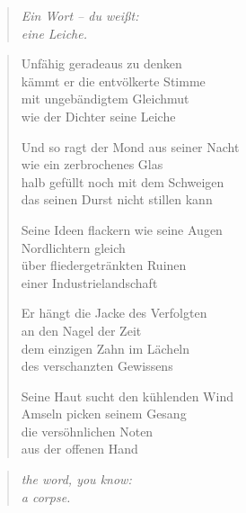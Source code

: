 
\cleartoverso


\begin{quote}
\itshape\smaller
Ein Wort -- du weißt:\\
eine Leiche.

\end{quote}

\begin{verse}

Unfähig geradeaus zu denken\\
kämmt er die entvölkerte Stimme\\
mit ungebändigtem Gleichmut\\
wie der Dichter seine Leiche

Und so ragt der Mond aus seiner Nacht\\
wie ein zerbrochenes Glas\\
halb gefüllt noch mit dem Schweigen\\
das seinen Durst nicht stillen kann

Seine Ideen flackern wie seine Augen\\
Nordlichtern gleich\\
über fliedergetränkten Ruinen\\
einer Industrielandschaft

Er hängt die Jacke des Verfolgten\\
an den Nagel der Zeit\\
dem einzigen Zahn im Lächeln\\
des verschanzten Gewissens

\clearpage

Seine Haut sucht den kühlenden Wind\\
Amseln picken seinem Gesang\\
die versöhnlichen Noten\\
aus der offenen Hand

\end{verse}

\clearpage


\begin{quote}
\itshape\smaller
the word, you know:\\
a corpse.

\end{quote}

